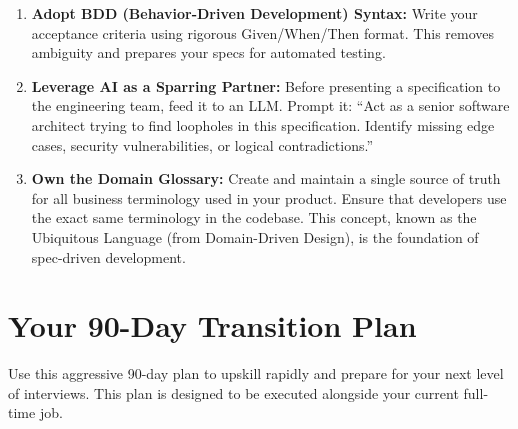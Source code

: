 \begin{enumerate}
  account balance can never be less than zero unless the account has an
  approved overdraft limit.'')
\item
  \textbf{Adopt BDD (Behavior-Driven Development) Syntax:} Write your
  acceptance criteria using rigorous Given/When/Then format. This
  removes ambiguity and prepares your specs for automated testing.
\item
  \textbf{Leverage AI as a Sparring Partner:} Before presenting a
  specification to the engineering team, feed it to an LLM. Prompt it:
  ``Act as a senior software architect trying to find loopholes in this
  specification. Identify missing edge cases, security vulnerabilities,
  or logical contradictions.''
\item
  \textbf{Own the Domain Glossary:} Create and maintain a single source
  of truth for all business terminology used in your product. Ensure
  that developers use the exact same terminology in the codebase. This
  concept, known as the Ubiquitous Language (from Domain-Driven Design),
  is the foundation of spec-driven development.
\end{enumerate}

\bigskip

\section{Your 90-Day Transition Plan}\label{your-90-day-transition-plan}

Use this aggressive 90-day plan to upskill rapidly and prepare for your
next level of interviews. This plan is designed to be executed alongside
your current full-time job.

